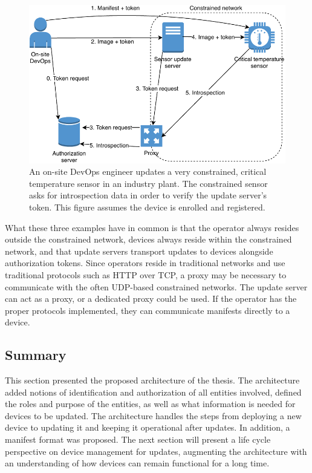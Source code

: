 \documentclass[0-thesis.tex]{subfiles}
\begin{document}
\begin{figure}[t]
    \caption[An on-site DevOps engineer updates a very constrained, critical temperature
    sensor in an industry plant.]
        {An on-site DevOps engineer updates a very constrained, critical temperature
                sensor in an industry plant. The constrained sensor asks for introspection
                data in order to verify the update server's token. This figure assumes the device is enrolled and registered.}
    \label{fig:industry}
    \includegraphics{images/use-case-industry.pdf}
\end{figure}

What these three examples have in common is that the operator always resides outside the
constrained network, devices always reside within the constrained network, and that update
servers transport updates to devices alongside authorization tokens. Since operators
reside in traditional networks and use traditional protocols such as HTTP over TCP, a
proxy may be necessary to communicate with the often UDP-based constrained networks. The
update server can act as a proxy, or a dedicated proxy could be used. If the operator has
the proper protocols implemented, they can communicate manifests directly to a device.

\subsection{Summary}
\label{ssec:architecture-summary}
This section presented the proposed architecture of the thesis. The architecture added
notions of identification and authorization of all entities involved, defined the roles
and purpose of the entities, as well as what information is needed for devices to be
updated. The architecture handles the steps from deploying a new device to updating it and
keeping it operational after updates. In addition, a manifest format was proposed. The next
section will present a life cycle perspective on device management for updates, augmenting
the architecture with an understanding of how devices can remain functional for a long
time.
\end{document}
